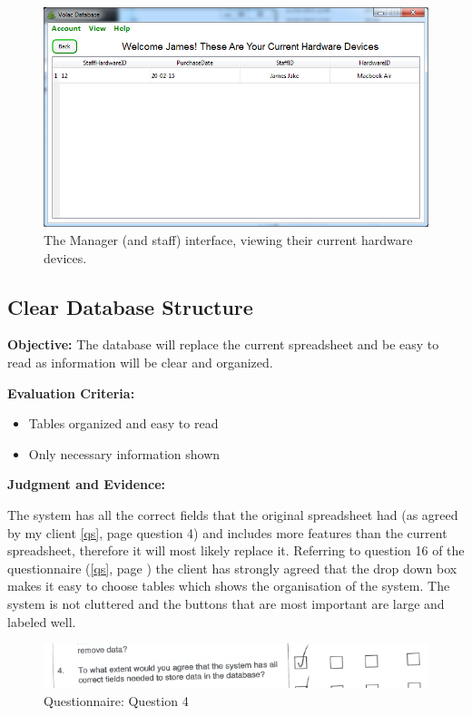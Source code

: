 \begin{figure}[H]
    \includegraphics[width=\textwidth]{./Evaluation/Images/database2.png}
    \caption{The Manager (and staff) interface, viewing their current hardware devices.} \label{fig:db3}
\end{figure}

\subsection{Clear Database Structure}

\textbf{Objective:} The database will replace the current spreadsheet and be easy to read as information will be clear and organized.

\textbf{Evaluation Criteria:}
\begin{itemize}
\item{Tables organized and easy to read}
\item{Only necessary information shown}
\end{itemize}

\textbf{Judgment and Evidence:}

The system has all the correct fields that the original spreadsheet had (as agreed by my client \ref{qs}, page \pageref{qs} question 4) and includes more features than the current spreadsheet, therefore it will most likely replace it. Referring to question 16 of the questionnaire (\ref{qs}, page \pageref{qs}) the client has strongly agreed that the drop down box makes it easy to choose tables which shows the organisation of the system. The system is not cluttered and the buttons that are most important are large and labeled well.

\begin{figure}[H]
    \includegraphics[width=\textwidth]{./Evaluation/EvaluationQuestionnaire/4.png}
    \caption{Questionnaire: Question 4} 
\end{figure}

